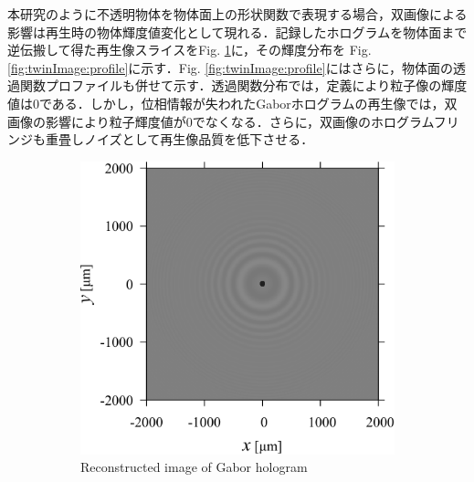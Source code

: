 本研究のように不透明物体を物体面上の形状関数で表現する場合，双画像による影響は再生時の物体輝度値変化として現れる．記録したホログラムを物体面まで逆伝搬して得た再生像スライスをFig. \ref{fig:twinImage:holo}に，その輝度分布を Fig. \ref{fig:twinImage:profile}に示す．Fig. \ref{fig:twinImage:profile}にはさらに，物体面の透過関数プロファイルも併せて示す．透過関数分布では，定義により粒子像の輝度値は0である．しかし，位相情報が失われたGaborホログラムの再生像では，双画像の影響により粒子輝度値が0でなくなる．さらに，双画像のホログラムフリンジも重畳しノイズとして再生像品質を低下させる．
\begin{figure}[htbp]
    \centering
    \begin{subfigure}[t]{0.48\linewidth}
        \includegraphics[width=\linewidth]{./Figure/2_Theory/twin_image/holo.pdf}
        \caption{Reconstructed image of Gabor hologram}
        \label{fig:twinImage:holo}
    \end{subfigure}
    \hfill
    \begin{subfigure}[t]{0.48\linewidth}

\end{subfigure}
\end{figure}
